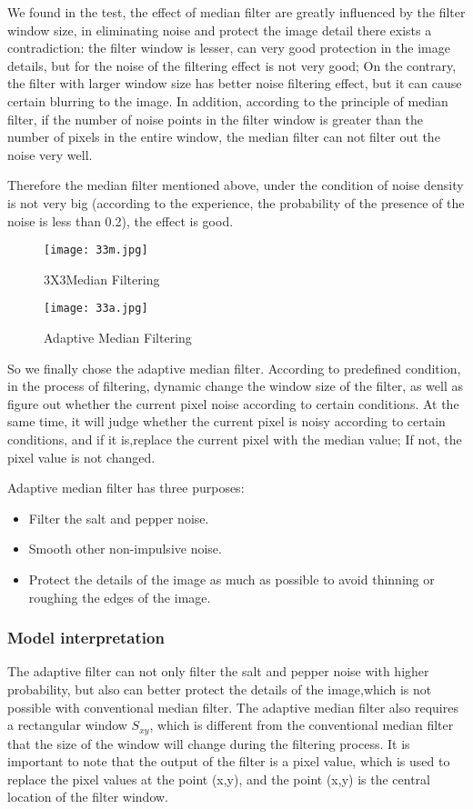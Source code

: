 \documentclass{mcmthesis}
\begin{document}
We found in the test, the effect of median filter are greatly influenced by the filter window size, in eliminating noise and protect the image detail there exists a contradiction: the filter window is lesser, can very good protection in the image details, but for the noise of the filtering effect is not very good; On the contrary, the filter with larger window size has better noise filtering effect, but it can cause certain blurring to the image.
In addition, according to the principle of median filter, if the number of noise points in the filter window is greater than the number of pixels in the entire window, the median filter can not filter out the noise very well.

Therefore the median filter mentioned above, under the condition of noise density is not very big (according to the experience, the probability of the presence of the noise is less than 0.2), the effect is good.

\begin{figure}[h]
\centering
\texttt{[image: 33m.jpg]}
\caption{3X3Median Filtering} \label{fig: 3X3Median Filtering}
\end{figure} 

\begin{figure}[h]
\centering
\texttt{[image: 33a.jpg]}
\caption{Adaptive Median Filtering} \label{fig: Adaptive Median Filtering}
\end{figure} 
  
So we finally chose the adaptive median filter. According to predefined condition, in the process of filtering, dynamic change the window size of the filter, as well as figure out whether the current pixel noise according to certain conditions. At the same time, it will judge whether the current pixel is noisy according to certain conditions, and if it is,replace the current pixel with the median value; If not, the pixel value is not changed.

Adaptive median filter has three purposes:
\begin{itemize}
  \item Filter the salt and pepper noise.
  \item Smooth other non-impulsive noise.
  \item Protect the details of the image as much as possible to avoid thinning or roughing the edges of the image.
\end{itemize}

\subsubsection{Model interpretation}
The adaptive filter can not only filter the salt and pepper noise with higher probability, but also can better protect the details of the image,which is not possible with conventional median filter.
The adaptive median filter also requires a rectangular window $S_{xy}$, which is different from the conventional median filter that the size of the window will change during the filtering process.
It is important to note that the output of the filter is a pixel value, which is used to replace the pixel values at the point (x,y), and the point (x,y) is the central location of the filter window.
\end{document}
